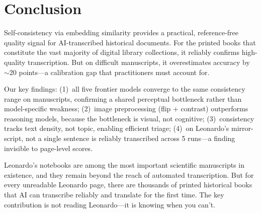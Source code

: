 \documentclass[10pt,twocolumn]{article}
\begin{document}
\section{Conclusion}

Self-consistency via embedding similarity provides a practical, reference-free quality signal for AI-transcribed historical documents. For the printed books that constitute the vast majority of digital library collections, it reliably confirms high-quality transcription. But on difficult manuscripts, it overestimates accuracy by ${\sim}$20 points---a calibration gap that practitioners must account for.

Our key findings: (1)~all five frontier models converge to the same consistency range on manuscripts, confirming a shared perceptual bottleneck rather than model-specific weakness; (2)~image preprocessing (flip + contrast) outperforms reasoning models, because the bottleneck is visual, not cognitive; (3)~consistency tracks text density, not topic, enabling efficient triage; (4)~on Leonardo's mirror-script, not a single sentence is reliably transcribed across 5 runs---a finding invisible to page-level scores.

Leonardo's notebooks are among the most important scientific manuscripts in existence, and they remain beyond the reach of automated transcription. But for every unreadable Leonardo page, there are thousands of printed historical books that AI can transcribe reliably and translate for the first time. The key contribution is not reading Leonardo---it is knowing when you can't.
\end{document}
